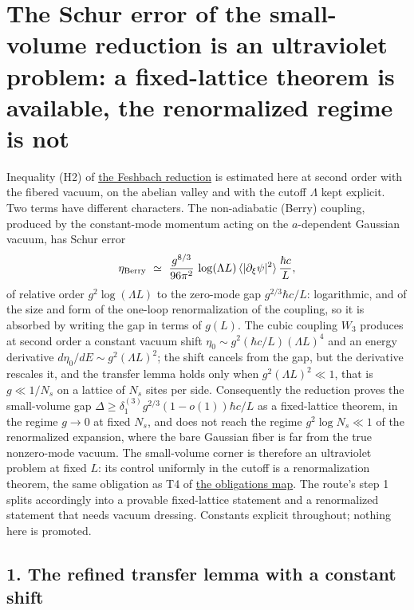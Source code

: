 \documentclass[11pt,a4paper]{article}
\begin{document}
\hypertarget{the-schur-error-of-the-small-volume-reduction-is-an-ultraviolet-problem-a-fixed-lattice-theorem-is-available-the-renormalized-regime-is-not}{%
\section{The Schur error of the small-volume reduction is an ultraviolet
problem: a fixed-lattice theorem is available, the renormalized regime
is
not}\label{the-schur-error-of-the-small-volume-reduction-is-an-ultraviolet-problem-a-fixed-lattice-theorem-is-available-the-renormalized-regime-is-not}}

Inequality (H2) of \href{weak-coupling-feshbach-reduction.md}{the
Feshbach reduction} is estimated here at second order with the fibered
vacuum, on the abelian valley and with the cutoff \(\Lambda\) kept
explicit. Two terms have different characters. The non-adiabatic (Berry)
coupling, produced by the constant-mode momentum acting on the
\(a\)-dependent Gaussian vacuum, has Schur error
\[\eta_{\rm Berry}\ \simeq\ \frac{g^{8/3}}{96\pi^2}\,\log(\Lambda L)\,\langle|\partial_\xi\psi|^2\rangle\,\frac{\hbar c}{L},\]
of relative order \(g^2\log(\Lambda L)\) to the zero-mode gap
\(g^{2/3}\hbar c/L\): logarithmic, and of the size and form of the
one-loop renormalization of the coupling, so it is absorbed by writing
the gap in terms of \(g(L)\). The cubic coupling \(W_3\) produces at
second order a constant vacuum shift
\(\eta_0\sim g^2(\hbar c/L)(\Lambda L)^4\) and an energy derivative
\(d\eta_0/dE\sim g^2(\Lambda L)^2\); the shift cancels from the gap, but
the derivative rescales it, and the transfer lemma holds only when
\(g^2(\Lambda L)^2\ll1\), that is \(g\ll1/N_s\) on a lattice of \(N_s\)
sites per side. Consequently the reduction proves the small-volume gap
\(\Delta\ge\delta_1^{(3)}g^{2/3}(1-o(1))\hbar c/L\) as a fixed-lattice
theorem, in the regime \(g\to0\) at fixed \(N_s\), and does not reach
the regime \(g^2\log N_s\ll1\) of the renormalized expansion, where the
bare Gaussian fiber is far from the true nonzero-mode vacuum. The
small-volume corner is therefore an ultraviolet problem at fixed \(L\):
its control uniformly in the cutoff is a renormalization theorem, the
same obligation as T4 of \href{mass-gap-obligations-lattice.md}{the
obligations map}. The route's step 1 splits accordingly into a provable
fixed-lattice statement and a renormalized statement that needs vacuum
dressing. Constants explicit throughout; nothing here is promoted.

\hypertarget{the-refined-transfer-lemma-with-a-constant-shift}{%
\subsection{1. The refined transfer lemma with a constant
shift}\label{the-refined-transfer-lemma-with-a-constant-shift}}
\end{document}
